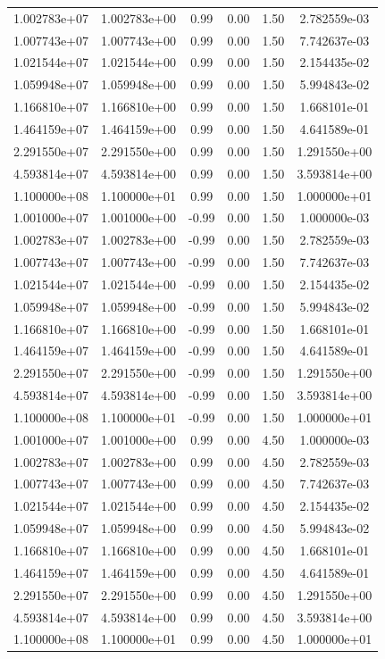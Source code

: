 \documentclass{article}
\begin{document}
\begin{table}[htbp]
\begin{tabular}{cccccc}
1.002783e+07 & 1.002783e+00 & 0.99 & 0.00 & 1.50 & 2.782559e-03 \\
1.007743e+07 & 1.007743e+00 & 0.99 & 0.00 & 1.50 & 7.742637e-03 \\
1.021544e+07 & 1.021544e+00 & 0.99 & 0.00 & 1.50 & 2.154435e-02 \\
1.059948e+07 & 1.059948e+00 & 0.99 & 0.00 & 1.50 & 5.994843e-02 \\
1.166810e+07 & 1.166810e+00 & 0.99 & 0.00 & 1.50 & 1.668101e-01 \\
1.464159e+07 & 1.464159e+00 & 0.99 & 0.00 & 1.50 & 4.641589e-01 \\
2.291550e+07 & 2.291550e+00 & 0.99 & 0.00 & 1.50 & 1.291550e+00 \\
4.593814e+07 & 4.593814e+00 & 0.99 & 0.00 & 1.50 & 3.593814e+00 \\
1.100000e+08 & 1.100000e+01 & 0.99 & 0.00 & 1.50 & 1.000000e+01 \\
1.001000e+07 & 1.001000e+00 & -0.99 & 0.00 & 1.50 & 1.000000e-03 \\
1.002783e+07 & 1.002783e+00 & -0.99 & 0.00 & 1.50 & 2.782559e-03 \\
1.007743e+07 & 1.007743e+00 & -0.99 & 0.00 & 1.50 & 7.742637e-03 \\
1.021544e+07 & 1.021544e+00 & -0.99 & 0.00 & 1.50 & 2.154435e-02 \\
1.059948e+07 & 1.059948e+00 & -0.99 & 0.00 & 1.50 & 5.994843e-02 \\
1.166810e+07 & 1.166810e+00 & -0.99 & 0.00 & 1.50 & 1.668101e-01 \\
1.464159e+07 & 1.464159e+00 & -0.99 & 0.00 & 1.50 & 4.641589e-01 \\
2.291550e+07 & 2.291550e+00 & -0.99 & 0.00 & 1.50 & 1.291550e+00 \\
4.593814e+07 & 4.593814e+00 & -0.99 & 0.00 & 1.50 & 3.593814e+00 \\
1.100000e+08 & 1.100000e+01 & -0.99 & 0.00 & 1.50 & 1.000000e+01 \\
1.001000e+07 & 1.001000e+00 & 0.99 & 0.00 & 4.50 & 1.000000e-03 \\
1.002783e+07 & 1.002783e+00 & 0.99 & 0.00 & 4.50 & 2.782559e-03 \\
1.007743e+07 & 1.007743e+00 & 0.99 & 0.00 & 4.50 & 7.742637e-03 \\
1.021544e+07 & 1.021544e+00 & 0.99 & 0.00 & 4.50 & 2.154435e-02 \\
1.059948e+07 & 1.059948e+00 & 0.99 & 0.00 & 4.50 & 5.994843e-02 \\
1.166810e+07 & 1.166810e+00 & 0.99 & 0.00 & 4.50 & 1.668101e-01 \\
1.464159e+07 & 1.464159e+00 & 0.99 & 0.00 & 4.50 & 4.641589e-01 \\
2.291550e+07 & 2.291550e+00 & 0.99 & 0.00 & 4.50 & 1.291550e+00 \\
4.593814e+07 & 4.593814e+00 & 0.99 & 0.00 & 4.50 & 3.593814e+00 \\
1.100000e+08 & 1.100000e+01 & 0.99 & 0.00 & 4.50 & 1.000000e+01 \\
\hline
\end{tabular}
\end{table}
\end{document}
